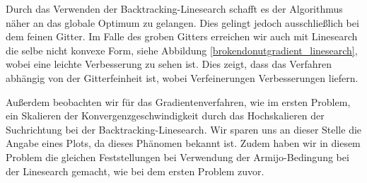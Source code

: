 Durch das Verwenden der Backtracking-Linesearch schafft es der Algorithmus näher an das globale Optimum zu gelangen. Dies gelingt jedoch ausschließlich bei dem feinen Gitter. Im Falle des groben Gitters erreichen wir auch mit Linesearch die selbe nicht konvexe Form, siehe Abbildung \ref{brokendonutgradient_linesearch}, wobei eine leichte Verbesserung zu sehen ist. Dies zeigt, dass das Verfahren abhängig von der Gitterfeinheit ist, wobei Verfeinerungen Verbesserungen liefern.

Außerdem beobachten wir für das Gradientenverfahren, wie im ersten Problem, ein Skalieren der Konvergenzgeschwindigkeit durch das Hochskalieren der Suchrichtung bei der Backtracking-Linesearch. Wir sparen uns an dieser Stelle die Angabe eines Plots, da dieses Phänomen bekannt ist.
Zudem haben wir in diesem Problem die gleichen Feststellungen bei Verwendung der Armijo-Bedingung bei der Linesearch gemacht, wie bei dem ersten Problem zuvor.

